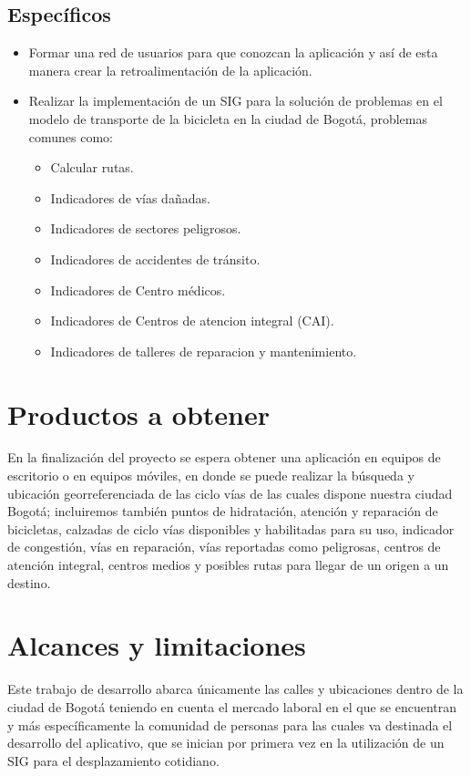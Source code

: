 \subsection{Específicos}

\begin{itemize}
	\item Formar una red de usuarios para que conozcan la aplicación y así de esta manera crear la retroalimentación de la aplicación.
	\item Realizar la implementación de un SIG para la solución de problemas en el modelo de transporte de la bicicleta en la ciudad de Bogotá, problemas comunes como: 
	\begin{itemize}
		\item Calcular rutas.
		\item Indicadores de vías dañadas.
		\item Indicadores de sectores peligrosos.
		\item Indicadores de accidentes de tránsito.
		\item Indicadores de Centro médicos.
		\item Indicadores de Centros de atencion integral (CAI).
		\item Indicadores de talleres de reparacion y mantenimiento.
	\end{itemize}
\end{itemize}

\section{Productos a obtener}

En la finalización del proyecto se espera obtener una aplicación en equipos de escritorio o en equipos móviles, en donde se puede realizar la búsqueda y ubicación georreferenciada de las  ciclo vías de las cuales dispone nuestra ciudad Bogotá; incluiremos también puntos de hidratación, atención y reparación de bicicletas, calzadas de ciclo vías disponibles y habilitadas para su uso, indicador de congestión, vías en reparación, vías reportadas como peligrosas, centros de atención integral, centros medios y posibles rutas para llegar de un origen a un destino.

\clearpage
\section{Alcances y limitaciones}

Este trabajo de desarrollo abarca únicamente las calles y ubicaciones dentro de la ciudad de Bogotá teniendo en cuenta el mercado laboral en el que se encuentran y más específicamente la comunidad de personas para las cuales va destinada el desarrollo del aplicativo, que se inician por primera vez en la utilización de un SIG para el desplazamiento cotidiano. \\

